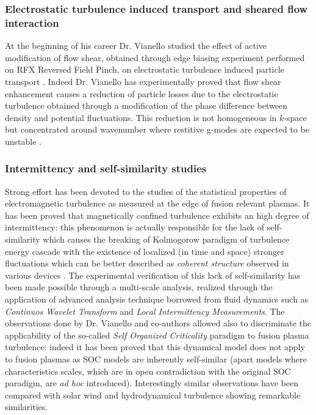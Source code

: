 \documentclass[12pt,a4paper]{article}
\begin{document}
\subsubsection*{Electrostatic turbulence induced transport and sheared
  flow interaction}
At the beginning of his career Dr. Vianello studied the effect of
active modification of flow shear, obtained
through edge biasing experiment performed on RFX Reversed Field Pinch,
on electrostatic turbulence induced particle transport
\parencite{Antoni:2000p3587}. Indeed Dr. Vianello has experimentally proved that
flow shear enhancement causes a reduction of particle losses due to the
electrostatic turbulence obtained through a modification of the phase
difference between density and potential fluctuations. This reduction
is not homogeneous in $k$-space but concentrated around wavenumber
where restitive g-modes are expected to be unstable
\parencite{Zuin:2010p4689}. 
\subsubsection*{Intermittency and self-similarity studies}
Strong effort has been devoted to the studies of the
statistical properties of electromagnetic turbulence as measured at
the edge of fusion relevant plasmas. It has been proved that
magnetically confined turbulence exhibits an high degree of
intermittency: this phenomenon is actually responsible for the lack of
self-similarity which causes the breaking of Kolmogorow paradigm of
turbulence energy cascade with the existence of localized (in
time and space) stronger fluctuations which can be better described as
\emph{coherent structure} observed in various devices
\cite{Spolaore:2004p245, Vianello:2002p3579,eps31tpe}. The experimental verification of this lack
of self-similarity has been made possible through a multi-scale
analysis, realized through the application of advanced analysis
technique 
borrowed from fluid dynamics such as
\emph{Continuos Wavelet Transform} and \emph{Local Intermittency
  Measurements}. The observations done by Dr. Vianello and co-authors
allowed also to discriminate the applicability of the so-called
\emph{Self Organized Criticality}  paradigm to fusion plasma
turbulence: indeed it has been proved that this dynamical model does
not apply to fusion plasmas \cite{Spada:2001p3574,Antoni:2001p3221} as
SOC models are inherently self-similar (apart models where
characteristics scales, which are in open contradiction with the
original SOC paradigm, are \emph{ad hoc} introduced). Interestingly
similar observations have been compared with solar wind and
hydrodynamical turbulence\cite{Carbone:2002p2809} showing remarkable similarities.
\end{document}
